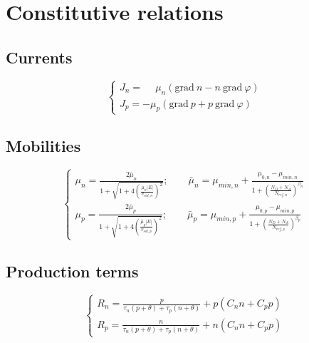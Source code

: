\documentclass[10pt]{article}
\begin{document}
\section{Constitutive relations}

\subsection{Currents}

\begin{equation}\label{eq:currents}
\left\{
\begin{array}{ll}
J_{n} = \phantom{-}\mu_{n} \left( \mathrm{grad}\ n - n\ \mathrm{grad}\ \varphi\right) 
\\[5mm]
J_{p} = -\mu_{p} \left( \mathrm{grad}\ p + p\ \mathrm{grad}\ \varphi\right)  
\end{array}
\right.
\end{equation}

\subsection{Mobilities}

\begin{equation}\label{eq:mobilities}
\left\{
\begin{array}{ll}
\mu_{n} = \displaystyle \frac{2\bar{\mu}_{n}}
{1 + \sqrt{1 + 4 \left( \displaystyle \frac{\bar{\mu}_{n}|E|}{v_{sat,n}}\right)^{2}}}
; \qquad
\bar{\mu}_{n} = \mu_{min, n} + 
\displaystyle \frac{\mu_{0,n} - \mu_{min,n}}
{1 +\displaystyle \left(\frac{N_{D}+N_{A}}{N_{ref,n}}\right)^{\beta_{n}}}
\\[10mm]
\mu_{p} = \displaystyle \frac{2\bar{\mu}_{p}}
{1 + \sqrt{1 + 4 \left( \displaystyle \frac{\bar{\mu}_{p}|E|}{v_{sat,p}}\right)^{2}}}
; \qquad
\bar{\mu}_{p} = \mu_{min, p} + 
\displaystyle \frac{\mu_{0,p} - \mu_{min,p}}
{1 +\displaystyle \left(\frac{N_{D}+N_{A}}{N_{ref,p}}\right)^{\beta_{p}}}
\end{array}
\right.
\end{equation}

\subsection{Production terms}

\begin{equation}\label{eq:recombination}
\left\{
\begin{array}{ll}
R_{n} = \displaystyle 
\frac{p}{\tau_{n} (p + \theta) + \tau_{p} (n + \theta)}
+ p \left(C_{n} n + C_{p} p \right)
\\[5mm]
R_{p} = \displaystyle 
\frac{n}{\tau_{n} (p + \theta) + \tau_{p} (n + \theta)}
+ n \left (C_{n} n + C_{p} p \right)
\end{array}
\right.
\end{equation}
\end{document}
